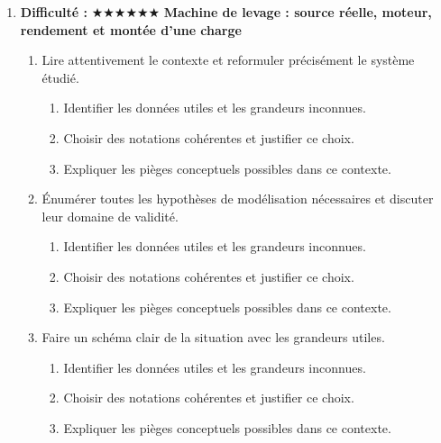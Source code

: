 \documentclass[11pt,a4paper]{article}
\newcommand{\etoiles}[1]{\textbf{Difficulté : }#1}
\begin{document}
\begin{enumerate}[label=\textbf{Très long \arabic*.},leftmargin=*]
\begin{enumerate}[label=\textbf{\arabic*)}]
\begin{enumerate}[label=\alph*)]
\item Proposer une ouverture vers une situation réelle plus complexe.
\end{enumerate}
\item Rédiger une conclusion scientifique : résultats, limites, prolongements vers la Terminale ou au-delà.
\begin{enumerate}[label=\alph*)]
\item Comparer au moins deux scénarios différents.
\item Discuter la robustesse du résultat face à une variation de paramètre.
\item Proposer une ouverture vers une situation réelle plus complexe.
\end{enumerate}
\end{enumerate}
\item \etoiles{★★★★★★}
\textbf{Machine de levage : source réelle, moteur, rendement et montée d'une charge}
\begin{enumerate}[label=\textbf{\arabic*)}]
\item Lire attentivement le contexte et reformuler précisément le système étudié.
\begin{enumerate}[label=\alph*)]
\item Identifier les données utiles et les grandeurs inconnues.
\item Choisir des notations cohérentes et justifier ce choix.
\item Expliquer les pièges conceptuels possibles dans ce contexte.
\end{enumerate}
\item Énumérer toutes les hypothèses de modélisation nécessaires et discuter leur domaine de validité.
\begin{enumerate}[label=\alph*)]
\item Identifier les données utiles et les grandeurs inconnues.
\item Choisir des notations cohérentes et justifier ce choix.
\item Expliquer les pièges conceptuels possibles dans ce contexte.
\end{enumerate}
\item Faire un schéma clair de la situation avec les grandeurs utiles.
\begin{enumerate}[label=\alph*)]
\item Identifier les données utiles et les grandeurs inconnues.
\item Choisir des notations cohérentes et justifier ce choix.
\item Expliquer les pièges conceptuels possibles dans ce contexte.

\end{enumerate}
\end{enumerate}
\end{enumerate}
\end{document}
